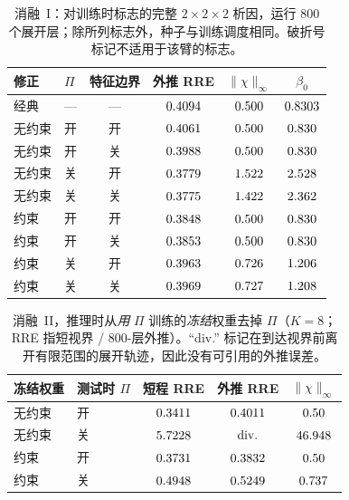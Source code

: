 \documentclass[UTF8,a4paper,11pt]{ctexart}
\newcommand{\infn}[1]{\lVert #1 \rVert_{\infty}}
\newcommand{\numv}[1]{#1}
\begin{document}
\begin{table}[htbp]
\centering
\caption{消融~I：对训练时标志的完整 $2\times2\times2$ 析因，运行 $800$ 个展开层；除所列标志外，种子与训练调度相同。破折号标记不适用于该臂的标志。}
\label{tab:abl}
\begin{tabular}{llcccc}
\toprule
修正 & $\Pi$ & 特征边界 & 外推 RRE & $\infn{\chi}$ & $\beta_0$ \\
\midrule
经典 & --- & --- & $\numv{\NumAblClsProjOn}$ & $\numv{\NumAblClsChi}$ & $\numv{\betacert}$ \\
无约束  & 开  & 开  & $\numv{\NumAblUncPOnFbOnRre}$ & $\numv{\NumAblUncPOnFbOnChi}$ & $\numv{\NumBetaUncPOnFbOn}$ \\
无约束  & 开  & 关 & $\numv{\NumAblUncPOnFbOffRre}$ & $\numv{\NumAblUncPOnFbOffChi}$ & $\numv{\NumBetaUncPOnFbOff}$ \\
无约束  & 关 & 开  & $\numv{\NumAblUncPOffFbOnRre}$ & $\numv{\NumAblUncPOffFbOnChi}$ & $\numv{\NumBetaUncPOffFbOn}$ \\
无约束  & 关 & 关 & $\numv{\NumAblUncPOffFbOffRre}$ & $\numv{\NumAblUncPOffFbOffChi}$ & $\numv{\NumBetaUncPOffFbOff}$ \\
约束 & 开  & 开  & $\numv{\NumAblConsPOnFbOnRre}$ & $\numv{\NumAblConsPOnFbOnChi}$ & $\numv{\NumBetaConsPOnFbOn}$ \\
约束 & 开  & 关 & $\numv{\NumAblConsPOnFbOffRre}$ & $\numv{\NumAblConsPOnFbOffChi}$ & $\numv{\NumBetaConsPOnFbOff}$ \\
约束 & 关 & 开  & $\numv{\NumAblConsPOffFbOnRre}$ & $\numv{\NumAblConsPOffFbOnChi}$ & $\numv{\NumBetaConsPOffFbOn}$ \\
约束 & 关 & 关 & $\numv{\NumAblConsPOffFbOffRre}$ & $\numv{\NumAblConsPOffFbOffChi}$ & $\numv{\NumBetaConsPOffFbOff}$ \\
\bottomrule
\end{tabular}
\end{table}
\begin{table}[htbp]
\centering
\caption{消融~II，推理时从\emph{用} $\Pi$ 训练的\emph{冻结}权重去掉 $\Pi$（$K=8$；RRE 指短视界 / $800$-层外推）。“div.” 标记在到达视界前离开有限范围的展开轨迹，因此没有可引用的外推误差。}
\label{tab:abl2}
\begin{tabular}{llccc}
\toprule
冻结权重 & 测试时 $\Pi$ & 短程 RRE & 外推 RRE & $\infn{\chi}$ \\
\midrule
无约束 & 开  & $\numv{\NumFrzUncOnShort}$ & $\numv{\NumFrzUncOn}$ & $\numv{\chimax}$ \\
无约束 & 关 & $\numv{\NumFrzUncOffShort}$ & $\numv{\NumFrzUncOff}$ & $\numv{\NumFrzUncOffChi}$ \\
约束   & 开  & $\numv{\NumFrzConsOnShort}$ & $\numv{\NumFrzConsOn}$ & $\numv{\chimax}$ \\
约束   & 关 & $\numv{\NumFrzConsOffShort}$ & $\numv{\NumFrzConsOff}$ & $\numv{\NumFrzConsOffChi}$ \\
\bottomrule
\end{tabular}
\end{table}
\end{document}
